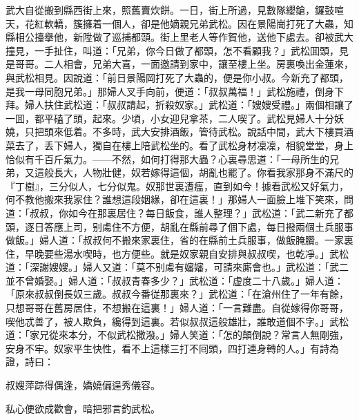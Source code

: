 武大自從搬到縣西街上來，照舊賣炊餅。一日，街上所過，見數隊纓鎗，鑼鼓喧天，花紅軟轎，簇擁着一個人，卻是他嫡親兄弟武松。因在景陽崗打死了大蟲，知縣相公擡擧他，新陞做了巡捕都頭。街上里老人等作賀他，送他下處去。卻被武大撞見，一手扯住，叫道：「兄弟，你今日做了都頭，怎不看顧我？」武松囬頭，見是哥哥。二人相會，兄弟大喜，一面邀請到家中，讓至樓上坐。房裏喚出金蓮來，與武松相見。因說道：「前日景陽岡打死了大蟲的，便是你小叔。今新充了都頭，是我一母同胞兄弟。」那婦人叉手向前，便道：「叔叔萬福！」武松施禮，倒身下拜。婦人扶住武松道：「叔叔請起，折殺奴家。」武松道：「嫂嫂受禮。」兩個相讓了一囬，都平磕了頭，起來。少頃，小女迎兒拿茶，二人喫了。武松見婦人十分妖嬈，只把頭來低着。不多時，武大安排酒飯，管待武松。說話中間，武大下樓買酒菜去了，丢下婦人，獨自在樓上陪武松坐的。看了武松身材凜凜，相貌堂堂，身上恰似有千百斤氣力。——不然，如何打得那大蟲？心裏尋思道：「一母所生的兄弟，又這般長大，人物壯健，奴若嫁得這個，胡亂也罷了。你看我家那身不滿尺的『丁樹』，三分似人，七分似鬼。奴那世裏遭瘟，直到如今！據看武松又好氣力，何不教他搬來我家住？誰想這段姻緣，卻在這裏！」那婦人一面臉上堆下笑來，問道：「叔叔，你如今在那裏居住？每日飯食，誰人整理？」武松道：「武二新充了都頭，逐日答應上司，别䖏住不方便，胡亂在縣前尋了個下處，每日撥兩個土兵服事做飯。」婦人道：「叔叔何不搬來家裏住，省的在縣前土兵服事，做飯腌臢。一家裏住，早晚要些湯水喫時，也方便些。就是奴家親自安排與叔叔喫，也乾凈。」武松道：「深謝嫂嫂。」婦人又道：「莫不别䖏有嬸嬸，可請來廝會也。」武松道：「武二並不曾婚娶。」婦人道：「叔叔青春多少？」武松道：「虚度二十八歲。」婦人道：「原來叔叔倒長奴三歲。叔叔今番従那裏來？」武松道：「在滄州住了一年有餘，只想哥哥在舊房居住，不想搬在這裏！」婦人道：「一言難盡。自從嫁得你哥哥，喫他忒善了，被人欺負，纔得到這裏。若似叔叔這般雄壯，誰敢道個不字。」武松道：「家兄從來本分，不似武松撒潑。」婦人笑道：「怎的顛倒說？常言人無剛強，安身不牢。奴家平生快性，看不上這樣三打不囘頭，四打連身轉的人。」有詩為證，詩曰：

\begin{myquote}
叔嫂萍踪得偶逢，嬌嬈偏逞秀儀容。

私心便欲成歡會，暗把邪言釣武松。
\end{myquote}

